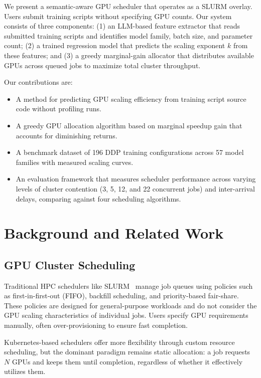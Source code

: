 \documentclass[letterpaper,10pt]{article}
\begin{document}
We present a semantic-aware GPU scheduler that operates as a SLURM overlay. Users submit training scripts without specifying GPU counts. Our system consists of three components: (1) an LLM-based feature extractor that reads submitted training scripts and identifies model family, batch size, and parameter count; (2) a trained regression model that predicts the scaling exponent $k$ from these features; and (3) a greedy marginal-gain allocator that distributes available GPUs across queued jobs to maximize total cluster throughput.

Our contributions are:
\begin{itemize}
    \item A method for predicting GPU scaling efficiency from training script source code without profiling runs.
    \item A greedy GPU allocation algorithm based on marginal speedup gain that accounts for diminishing returns.
    \item A benchmark dataset of 196 DDP training configurations across 57 model families with measured scaling curves.
    \item An evaluation framework that measures scheduler performance across varying levels of cluster contention (3, 5, 12, and 22 concurrent jobs) and inter-arrival delays, comparing against four scheduling algorithms.
\end{itemize}

\section{Background and Related Work}
\label{sec:related}

\subsection{GPU Cluster Scheduling}

Traditional HPC schedulers like SLURM~\cite{yoo2003slurm} manage job queues using policies such as first-in-first-out (FIFO), backfill scheduling, and priority-based fair-share. These policies are designed for general-purpose workloads and do not consider the GPU scaling characteristics of individual jobs. Users specify GPU requirements manually, often over-provisioning to ensure fast completion.

Kubernetes-based schedulers offer more flexibility through custom resource scheduling, but the dominant paradigm remains static allocation: a job requests $N$ GPUs and keeps them until completion, regardless of whether it effectively utilizes them.
\end{document}
